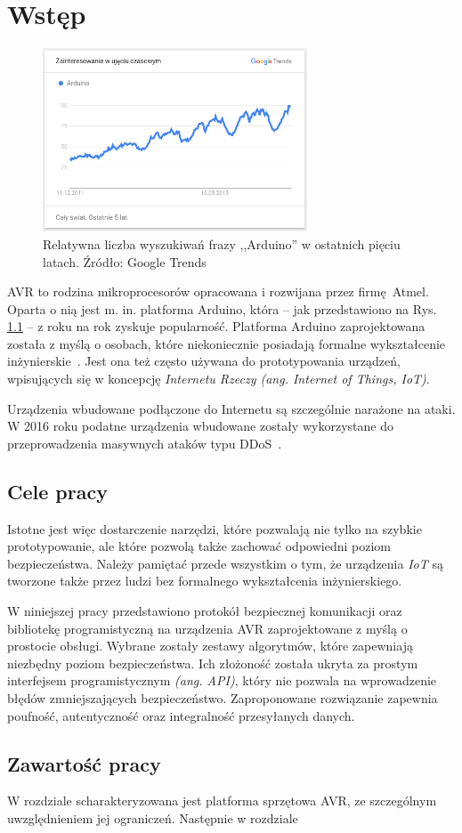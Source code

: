 \chapter{Wstęp}
\label{cha:wstep}

\begin{figure}[h]
\centering
\includegraphics[width=0.7\textwidth]{images/arduino-trends.png}
\caption{Relatywna liczba wyszukiwań frazy ,,Arduino'' w ostatnich pięciu latach. Źródło: Google Trends}
\label{fig:arduinotrends}
\end{figure}

AVR to rodzina mikroprocesorów opracowana i rozwijana przez firmę Atmel. Oparta o nią jest m. in. platforma Arduino, która -- jak przedstawiono na Rys. \ref{fig:arduinotrends} -- z roku na rok zyskuje popularność. Platforma Arduino zaprojektowana została z myślą o osobach, które niekoniecznie posiadają formalne wykształcenie inżynierskie~\cite{BanShi14}. Jest ona też często używana do prototypowania urządzeń, wpisujących się w koncepcję \emph{Internetu Rzeczy (ang. Internet of Things, IoT)}.

Urządzenia wbudowane podłączone do Internetu są szczególnie narażone na ataki. W 2016 roku podatne urządzenia wbudowane zostały wykorzystane do przeprowadzenia masywnych ataków typu DDoS~\cite{AkaIOT}.

\section{Cele pracy}

Istotne jest więc dostarczenie narzędzi, które pozwalają nie tylko na szybkie prototypowanie, ale które pozwolą także zachować odpowiedni poziom bezpieczeństwa. Należy pamiętać przede wszystkim o tym, że urządzenia \emph{IoT} są tworzone także przez ludzi bez formalnego wykształcenia inżynierskiego.

W niniejszej pracy przedstawiono protokół bezpiecznej komunikacji oraz bibliotekę programistyczną na urządzenia AVR zaprojektowane z myślą o prostocie obsługi. Wybrane zostały zestawy algorytmów, które zapewniają niezbędny poziom bezpieczeństwa. Ich złożoność została ukryta za prostym interfejsem programistycznym \emph{(ang. API)}, który nie pozwala na wprowadzenie błędów zmniejszających bezpieczeństwo.  Zaproponowane rozwiązanie zapewnia poufność, autentyczność oraz integralność przesyłanych danych.

\section{Zawartość pracy}

W rozdziale \cite{cha:hardware} scharakteryzowana jest platforma sprzętowa AVR, ze szczególnym uwzględnieniem jej ograniczeń. Następnie w rozdziale \cite{cha:metodyUwierzytelniania}
